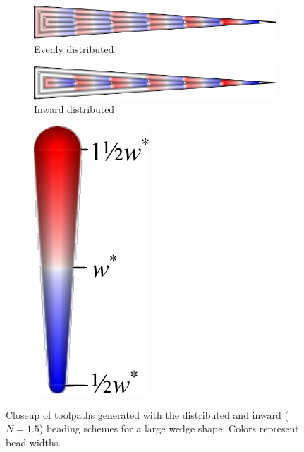 \begin{figure}
\centering
\setlength{\figwidth}{.8\columnwidth}
\setlength{\figheight}{.3\columnwidth}
\begin{minipage}[b]{0.8\linewidth}
\begin{subfigure}[t]{\figwidth}\centering
\includegraphics[width=\figwidth]{sources-validation-wedge-Distributed-pretty-evenly.png}
\caption{Evenly distributed}
\end{subfigure}
\begin{subfigure}[t]{\figwidth}\centering
\includegraphics[width=\figwidth]{sources-validation-wedge-Distributed-pretty-inward.png}
\caption{Inward distributed}
\end{subfigure}
\end{minipage}
\begin{subfigure}[t]{.1\columnwidth}\centering
\includegraphics[height=\figheight]{sources-validation-widths-legend-small.pdf}
\end{subfigure}
\caption{
Closeup of toolpaths generated with the distributed {and inward ($N=1.5$)} beading schemes for a large wedge shape.
Colors represent bead widths.
}
\label{distributed_comparison}
\end{figure}








